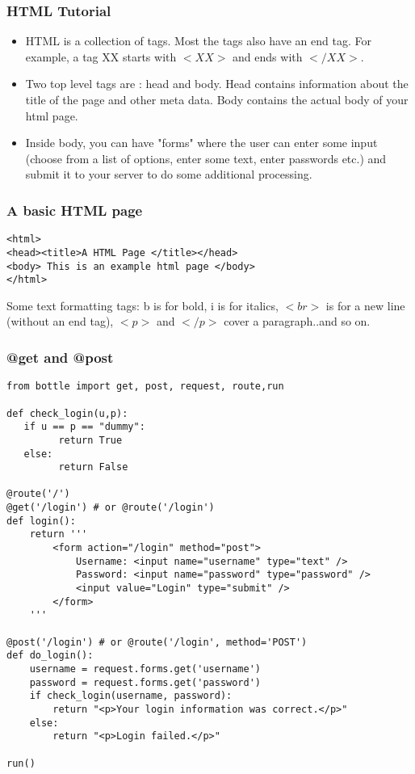 \documentclass{beamer}
\begin{document}
\begin{frame}
\frametitle{HTML Tutorial}
\begin{itemize}
\item HTML is a collection of tags. Most the tags also have an end tag. For example, a tag XX starts with $<XX>$ and ends with $</XX>$.
\item Two top level tags are : head and body. Head contains information about the title of the page and other meta data. Body contains the actual body of your html page.
\item Inside body, you can have "forms" where the user can enter some input (choose from a list of options, enter some text, enter passwords etc.) and submit it to your server to do some additional processing.
\end{itemize}
\end{frame}

\begin{frame}[fragile]
\frametitle{A basic HTML page}
\begin{verbatim}
<html>
<head><title>A HTML Page </title></head>
<body> This is an example html page </body>
</html>
\end{verbatim}
Some text formatting tags: b is for bold, i is for italics, $<br>$ is for a new line (without an end tag), $<p>$ and $</p>$ cover a paragraph..and so on.
\end{frame}


\begin{frame}[fragile]
\frametitle{@get and @post}
\tiny
\begin{verbatim}
from bottle import get, post, request, route,run

def check_login(u,p):
   if u == p == "dummy":
         return True
   else:
         return False

@route('/')
@get('/login') # or @route('/login')
def login():
    return '''
        <form action="/login" method="post">
            Username: <input name="username" type="text" />
            Password: <input name="password" type="password" />
            <input value="Login" type="submit" />
        </form>
    '''

@post('/login') # or @route('/login', method='POST')
def do_login():
    username = request.forms.get('username')
    password = request.forms.get('password')
    if check_login(username, password):
        return "<p>Your login information was correct.</p>"
    else:
        return "<p>Login failed.</p>"
        
run()
\end{verbatim}
\end{frame}
\end{document}
